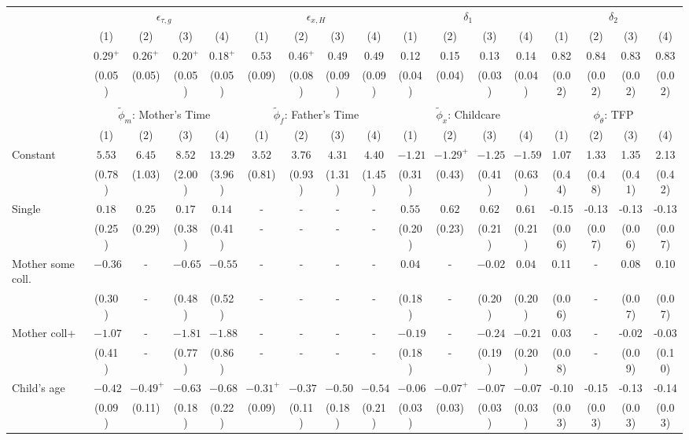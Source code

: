 \begin{tabular}{lcccccccccccccccc}\\\toprule
 & \multicolumn{4}{c}{$\epsilon_{\tau,g}$} & \multicolumn{4}{c}{$\epsilon_{x,H}$} & \multicolumn{4}{c}{$\delta_{1}$} & \multicolumn{4}{c}{$\delta_{2}$} \\
&(1)&(2)&(3)&(4)&(1)&(2)&(3)&(4)&(1)&(2)&(3)&(4)&(1)&(2)&(3)&(4)\\\cmidrule(r){2-5}\cmidrule(r){6-9}\cmidrule(r){10-13}\cmidrule(r){14-17}
&$0.29^{+}$&$0.26^{+}$&$0.20^{+}$&$0.18^{+}$&$0.53$&$0.46^{+}$&$0.49$&$0.49$&0.12&0.15&0.13&0.14&0.82&0.84&0.83&0.83\\
&(0.05)&(0.05)&(0.05)&(0.05)&(0.09)&(0.08)&(0.09)&(0.09)&(0.04)&(0.04)&(0.03)&(0.04)&(0.02)&(0.02)&(0.02)&(0.02)\\
&&&&&&&&&&&&&&&&\\
 & \multicolumn{4}{c}{$\tilde{\phi}_{m}$: Mother's Time} & \multicolumn{4}{c}{$\tilde{\phi}_{f}$: Father's Time} & \multicolumn{4}{c}{$\tilde{\phi}_{x}$: Childcare} & \multicolumn{4}{c}{$\phi_{\theta}$: TFP} \\
&(1)&(2)&(3)&(4)&(1)&(2)&(3)&(4)&(1)&(2)&(3)&(4)&(1)&(2)&(3)&(4)\\\cmidrule(r){2-5}\cmidrule(r){6-9}\cmidrule(r){10-13}\cmidrule(r){14-17}
Constant&$5.53$&$6.45$&$8.52$&$13.29$&$3.52$&$3.76$&$4.31$&$4.40$&$-1.21$&$-1.29^{+}$&$-1.25$&$-1.59$&1.07&1.33&1.35&2.13\\
&(0.78)&(1.03)&(2.00)&(3.96)&(0.81)&(0.93)&(1.31)&(1.45)&(0.31)&(0.43)&(0.41)&(0.63)&(0.44)&(0.48)&(0.41)&(0.42)\\
Single&$0.18$&$0.25$&$0.17$&$0.14$&-&-&-&-&$0.55$&$0.62$&$0.62$&$0.61$&-0.15&-0.13&-0.13&-0.13\\
&(0.25)&(0.29)&(0.38)&(0.41)&-&-&-&-&(0.20)&(0.23)&(0.21)&(0.21)&(0.06)&(0.07)&(0.06)&(0.07)\\
Mother some coll.&$-0.36$&-&$-0.65$&$-0.55$&-&-&-&-&$0.04$&-&$-0.02$&$0.04$&0.11&-&0.08&0.10\\
&(0.30)&-&(0.48)&(0.52)&-&-&-&-&(0.18)&-&(0.20)&(0.20)&(0.06)&-&(0.07)&(0.07)\\
Mother coll+&$-1.07$&-&$-1.81$&$-1.88$&-&-&-&-&$-0.19$&-&$-0.24$&$-0.21$&0.03&-&-0.02&-0.03\\
&(0.41)&-&(0.77)&(0.86)&-&-&-&-&(0.18)&-&(0.19)&(0.20)&(0.08)&-&(0.09)&(0.10)\\
Child's age&$-0.42$&$-0.49^{+}$&$-0.63$&$-0.68$&$-0.31^{+}$&$-0.37$&$-0.50$&$-0.54$&$-0.06$&$-0.07^{+}$&$-0.07$&$-0.07$&-0.10&-0.15&-0.13&-0.14\\
&(0.09)&(0.11)&(0.18)&(0.22)&(0.09)&(0.11)&(0.18)&(0.21)&(0.03)&(0.03)&(0.03)&(0.03)&(0.03)&(0.03)&(0.03)&(0.03)\\

\end{tabular}
